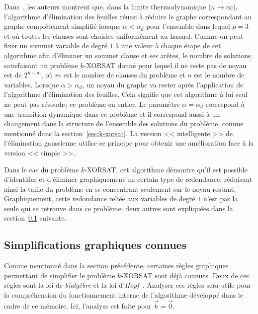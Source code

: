Dans~\cite{mezard_alternative_2002}, les auteurs montrent que, dans la limite thermodynamique ($n \rightarrow \infty$), l'algorithme d'élimination des feuilles réussi à réduire le graphe correspondant au graphe complètement simplifié lorsque $ \alpha < \alpha_d$ pour l'ensemble dans lequel $p = 3$ et où toutes les clauses sont choisies uniformément au hasard.
Comme on peut fixer un sommet variable de degré $1$ à une valeur à chaque étape de cet algorithme afin d'éliminer un sommet clause et ses arêtes, le nombre de solutions satisfaisant un problème $k$-XORSAT donné pour lequel il ne reste pas de noyau est de $2^{n-m}$, où $m$ est le nombre de clauses du problème et $n$ est le nombre de variables.
Lorsque $\alpha > \alpha_d$, un noyau du graphe va rester après l'application de l'algorithme d'élimination des feuilles.
Cela signifie que cet algorithme à lui seul ne peut pas résoudre ce problème en entier.
Le paramètre $\alpha = \alpha_d$ correspond à une transition dynamique dans ce problème et il correspond aussi à un changement dans la structure de l'ensemble des solutions du problème, comme mentionné dans la section~\ref{sec:k-xorsat}.
La version << intelligente >> de l'élimination gaussienne utilise ce principe pour obtenir une amélioration face à la version << simple >>.


Dans le cas du problème $k$-XORSAT, cet algorithme démontre qu'il est possible d'identifier et d'éliminer graphiquement un certain type de redondance, réduisant ainsi la taille du problème en se concentrant seulement sur le noyau restant.
Graphiquement, cette redondance reliée aux variables de degré $1$ n'est pas la seule qui se retrouve dans ce problème; deux autres sont expliquées dans la section~\ref{subsec:XORSAT-simplifications} suivante.

\subsection{Simplifications graphiques connues} \label{subsec:XORSAT-simplifications}
Comme mentionné dans la section précédente, certaines règles graphiques permettant de simplifier le problème $k$-XORSAT sont déjà connues.
Deux de ces règles sont la loi de \emph{bialgèbre} et la loi d'\emph{Hopf}~\cite{kasselQuantumGroups1995, denny_algebraically_2012}.
Analyser ces règles sera utile pour la compréhension du fonctionnement interne de l'algorithme développé dans le cadre de ce mémoire.
Ici, l'analyse est faite pour $\vec{b} = \vec{0}$.

